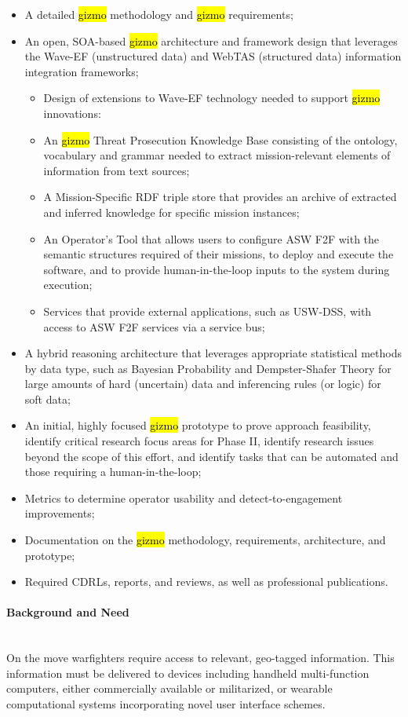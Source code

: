 \documentclass{sbir}
\begin{document}
\begin{itemize}
 \item A detailed \hl{gizmo} methodology and \hl{gizmo} requirements;
 \item An open, SOA-based \hl{gizmo} architecture and framework design that leverages the Wave-EF (unstructured data) and WebTAS (structured data) information integration frameworks;
  \begin{itemize}
   \item Design of extensions to Wave-EF technology needed to support \hl{gizmo} innovations:
   \item An \hl{gizmo} Threat Prosecution Knowledge Base consisting of the ontology, vocabulary and grammar needed to extract mission-relevant elements of information from text sources;
   \item A Mission-Specific RDF triple store that provides an archive of extracted and inferred knowledge for specific mission instances;
   \item An Operator's Tool that allows users to configure ASW F2F with the semantic structures required of their missions, to deploy and execute the software, and to provide human-in-the-loop inputs to the system during execution; 
   \item Services that provide external applications, such as USW-DSS, with access to ASW F2F services via a service bus;
 \end{itemize}
 \item A hybrid reasoning architecture that leverages appropriate statistical methods by data type, such as Bayesian Probability and Dempster-Shafer Theory for large amounts of hard (uncertain) data and inferencing rules (or logic) for soft data;
 \item An initial, highly focused \hl{gizmo} prototype to prove approach feasibility, identify critical research focus areas for Phase II, identify research issues beyond the scope of this effort, and identify tasks that can be automated and those requiring a human-in-the-loop;
 \item Metrics to determine operator usability and detect-to-engagement improvements;
 \item Documentation on the \hl{gizmo} methodology, requirements, architecture, and prototype;
 \item Required CDRLs, reports, and reviews, as well as professional publications.
\end{itemize} 

\paragraph{Background and Need}~\\
On the move warfighters require access to relevant, geo-tagged information. This information must be delivered to devices including handheld multi-function computers, either commercially available or militarized, or wearable computational systems incorporating novel user interface schemes.  
\end{document}
